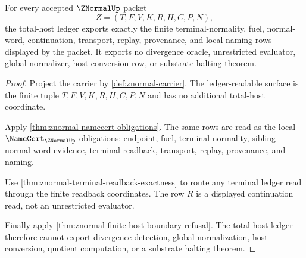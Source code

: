 \begin{theorem}
\label{thm:znormal-total-host-ledger-nonescape}
For every accepted $\ZNormalUp$ packet
$$
Z=(T,F,V,K,R,H,C,P,N),
$$
the total-host ledger exports exactly the finite terminal-normality, fuel,
normal-word, continuation, transport, replay, provenance, and local naming
rows displayed by the packet. It exports no divergence oracle, unrestricted
evaluator, global normalizer, host conversion row, or substrate halting
theorem.
\end{theorem}
\begin{proof}
Project the carrier by \autoref{def:znormal-carrier}. The ledger-readable
surface is the finite tuple $T,F,V,K,R,H,C,P,N$ and has no additional
total-host coordinate.

Apply \autoref{thm:znormal-namecert-obligations}. The same rows are read as
the local $\NameCert_{\ZNormalUp}$ obligations: endpoint, fuel, terminal
normality, sibling normal-word evidence, terminal readback, transport, replay,
provenance, and naming.

Use \autoref{thm:znormal-terminal-readback-exactness} to route any terminal
ledger read through the finite readback coordinates. The row $R$ is a
displayed continuation read, not an unrestricted evaluator.

Finally apply \autoref{thm:znormal-finite-host-boundary-refusal}. The
total-host ledger therefore cannot export divergence detection, global
normalization, host conversion, quotient computation, or a substrate halting
theorem.
\end{proof}
